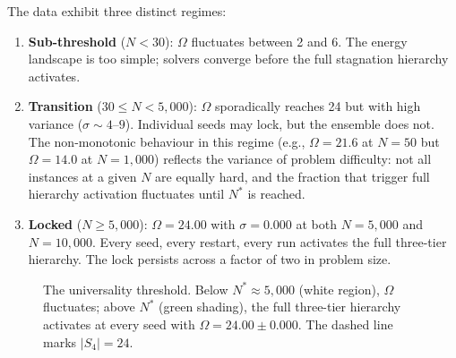 \documentclass[11pt,a4paper]{article}
\begin{document}
The data exhibit three distinct regimes:
\begin{enumerate}[nosep]
\item \textbf{Sub-threshold} ($N < 30$): $\Omega$ fluctuates between 2 and 6. The energy landscape is too simple; solvers converge before the full stagnation hierarchy activates.
\item \textbf{Transition} ($30 \leq N < 5{,}000$): $\Omega$ sporadically reaches 24 but with high variance ($\sigma \sim 4$--$9$). Individual seeds may lock, but the ensemble does not. The non-monotonic behaviour in this regime (e.g., $\Omega = 21.6$ at $N = 50$ but $\Omega = 14.0$ at $N = 1{,}000$) reflects the variance of problem difficulty: not all instances at a given $N$ are equally hard, and the fraction that trigger full hierarchy activation fluctuates until $N^*$ is reached.
\item \textbf{Locked} ($N \geq 5{,}000$): $\Omega = 24.00$ with $\sigma = 0.000$ at both $N = 5{,}000$ and $N = 10{,}000$. Every seed, every restart, every run activates the full three-tier hierarchy. The lock persists across a factor of two in problem size.
\end{enumerate}

\begin{figure}[H]
\centering
{}
\caption{The universality threshold. Below $N^* \approx 5{,}000$ (white region), $\Omega$ fluctuates; above $N^*$ (green shading), the full three-tier hierarchy activates at every seed with $\Omega = 24.00 \pm 0.000$. The dashed line marks $|S_4| = 24$.}
\label{fig:omega_transition}
\end{figure}
\end{document}
